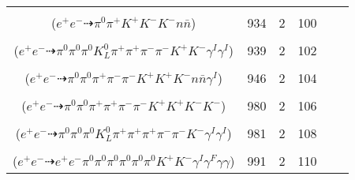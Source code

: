 \documentclass[landscape]{article}
\newcounter{rownumbers}
\newcommand\rn{\stepcounter{rownumbers}\arabic{rownumbers}}
\newcommand{\EOL}{\\} %
\newcommand{\topoTags}[1]{#1} %
\begin{document}
\begin{longtable}{clcccc}
\rn & \makecell[l]{ $ 
e^{+} e^{-} \rightarrow \pi^{+} K^{+} K^{-} K^{-} n \bar{\Lambda} ,
\bar{\Lambda} \rightarrow \pi^{0} \bar{n} 
$ \\ ($
e^{+} e^{-} \dashrightarrow \pi^{0} \pi^{+} K^{+} K^{-} K^{-} n \bar{n} 
$) } & \topoTags{934 & }2 & 100 \EOL

\rn & \makecell[l]{ $ 
e^{+} e^{-} \rightarrow \pi^{0} \pi^{0} \pi^{0} \bar{K}^{0} K^{*} K^{-} K^{*+} \gamma^{I} \gamma^{I} ,
\bar{K}^{0} \rightarrow K_{S}^{0} ,
K^{*} \rightarrow \pi^{-} K^{+} ,
K^{*+} \rightarrow \pi^{+} K^{0} ,
K_{S}^{0} \rightarrow \pi^{+} \pi^{-} ,
K^{0} \rightarrow K_{L}^{0} 
$ \\ ($
e^{+} e^{-} \dashrightarrow \pi^{0} \pi^{0} \pi^{0} K_{L}^{0} \pi^{+} \pi^{+} \pi^{-} \pi^{-} K^{+} K^{-} \gamma^{I} \gamma^{I} 
$) } & \topoTags{939 & }2 & 102 \EOL

\rn & \makecell[l]{ $ 
e^{+} e^{-} \rightarrow \pi^{+} \pi^{-} \rho^{-} K^{+} K^{+} K^{-} \bar{n} \Lambda \gamma^{I} ,
\rho^{-} \rightarrow \pi^{0} \pi^{-} ,
\Lambda \rightarrow \pi^{0} n 
$ \\ ($
e^{+} e^{-} \dashrightarrow \pi^{0} \pi^{0} \pi^{+} \pi^{-} \pi^{-} K^{+} K^{+} K^{-} n \bar{n} \gamma^{I} 
$) } & \topoTags{946 & }2 & 104 \EOL

\rn & \makecell[l]{ $ 
e^{+} e^{-} \rightarrow \pi^{0} \rho^{0} \pi^{+} \pi^{-} K^{+} K^{+} K^{-} K^{*-} ,
\rho^{0} \rightarrow \pi^{+} \pi^{-} ,
K^{*-} \rightarrow \pi^{0} K^{-} 
$ \\ ($
e^{+} e^{-} \dashrightarrow \pi^{0} \pi^{0} \pi^{+} \pi^{+} \pi^{-} \pi^{-} K^{+} K^{+} K^{-} K^{-} 
$) } & \topoTags{980 & }2 & 106 \EOL

\rn & \makecell[l]{ $ 
e^{+} e^{-} \rightarrow \pi^{+} \pi^{+} \pi^{-} \rho^{+} \rho^{-} K^{*} K^{-} \gamma^{I} \gamma^{I} ,
\rho^{+} \rightarrow \pi^{0} \pi^{+} ,
\rho^{-} \rightarrow \pi^{0} \pi^{-} ,
K^{*} \rightarrow \pi^{0} K^{0} ,
K^{0} \rightarrow K_{L}^{0} 
$ \\ ($
e^{+} e^{-} \dashrightarrow \pi^{0} \pi^{0} \pi^{0} K_{L}^{0} \pi^{+} \pi^{+} \pi^{+} \pi^{-} \pi^{-} K^{-} \gamma^{I} \gamma^{I} 
$) } & \topoTags{981 & }2 & 108 \EOL

\rn & \makecell[l]{ $ 
e^{+} e^{-} \rightarrow \pi^{0} \pi^{0} \pi^{0} \pi^{0} \eta \eta K^{+} K^{-} \gamma^{I} ,
\eta \rightarrow \gamma \gamma ,
\eta \rightarrow \pi^{0} \pi^{0} \pi^{0} ,
\pi^{0} \rightarrow e^{+} e^{-} \gamma^{F} 
$ \\ ($
e^{+} e^{-} \dashrightarrow e^{+} e^{-} \pi^{0} \pi^{0} \pi^{0} \pi^{0} \pi^{0} \pi^{0} K^{+} K^{-} \gamma^{I} \gamma^{F} \gamma \gamma 
$) } & \topoTags{991 & }2 & 110 \EOL


\end{longtable}
\end{document}
